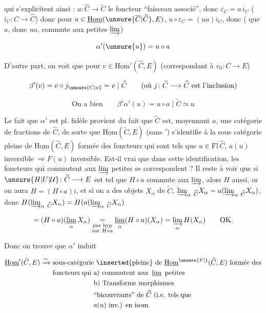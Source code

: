 qui s'explicitent ainsi :  $a\colon\widehat C\longrightarrow\widetilde C$ le foncteur ``faisceau associé'', donc $\varepsilon_C=a\,i_C$ ($i_C\colon C\longrightarrow\widehat C$) donc pour $u\in\underline{\mathrm{Hom}}(\unsure{\overline C|\widetilde C},E)$, $u\circ\varepsilon_C=(ua)i_C$, donc ( que $a$, donc $ua$, commute aux petites $\varinjlim$)

\[
\alpha'(\unsure{u})=u\circ a
\]

 D'autre part, on voit que pour $v\in\underline{\mathrm{Hom}}'(\widehat C,E)$ (correspondant à $v_0\colon C\longrightarrow E$)

\[
\beta'(v)=v\circ j_{\unsure{C|a}}=v\mid\widetilde C\qquad(\text{où }j\colon\widetilde C\longrightarrow\widehat C\text{ est l'inclusion})
\]

\[
\text{On a bien}\qquad\beta'\alpha'(u)=u\circ a\mid\widetilde C\simeq u
\]

Le fait que $\alpha'$ est pl. fidèle provient du fait que $\widetilde C$ est, moyennant $a$, une catégorie de fractions de $\widehat C$, de sorte que $\underline{\mathrm{Hom}}(\widetilde C,E)$ (sans $'$)  s'identifie à la sous catégorie pleine de $\underline{\mathrm{Hom}}(\widehat C,E)$ formée des foncteurs  qui sont tels que  $u\in\mathrm{Fl}\,\widehat C$, $a(u)$ inversible $\Longrightarrow F(u)$ inversible. Est-il vrai
que dans cette identification, les foncteurs qui commutent aux $\varinjlim$ petites se correspondent ? Il reste à voir que si $\unsure{H|U|\mathcal U}\colon\widetilde C\longrightarrow E$ est tel que $H\circ a$ commute aux $\varinjlim$, alors
$H$ aussi, or on aura $H=(H\circ a)i$, et si on a des objets $X_\alpha$ de $\widetilde C$, $\varinjlim_\alpha\,{}_{\widetilde C}X_\alpha=a(\varinjlim_\alpha\,{}_{\widehat C}X_\alpha)$, donc $H(\varinjlim_\alpha\,{}_{\widetilde C}X_\alpha)=H(a(\varinjlim_\alpha\,{}_{\widehat C}X_\alpha)$

\[
=(H\circ a)(\mathop{\underline{\lim}}_\alpha X_\alpha)\underset{\substack{\text{par hyp}\\\text{sur }H\circ a}}{=}\mathop{\underline{\lim}}_\alpha(H\circ a)(X_\alpha)=\varinjlim_\alpha H(X_\alpha)\qquad\text{OK.}
\]

Donc on trouve que $\alpha'$ induit

\[
\begin{aligned}
\underline{\mathrm{Hom}}'(\widetilde C,E)\xrightarrow{\simeq}{}&
\text{sous-catégorie \inserted{pleine} de }\underline{\mathrm{Hom}}^{\unsure{F|{}}}(\widehat C,E)\text{ formée des}\\
&\text{foncteurs qui a) commutent aux }\mathop{\underline{\lim}}\text{ petites}\\
&\hphantom{\text{foncteurs qui }}\text{b) Transforme morphismes}\\
&\hphantom{\text{foncteurs qui }}\text{``bicouvrants'' de }\widehat C\text{ (i.e. tels que}\\
&\hphantom{\text{foncteurs qui }}a(u)\text{ inv.) en isom.}
\end{aligned}
\]

